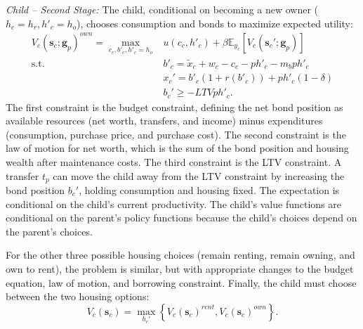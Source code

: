 \documentclass[12pt]{article}
\newcommand{\E}{\mathbb{E}}
\begin{document}
\textit{Child -- Second Stage:} The child, conditional on becoming a new owner ($h_c=h_r,h'_c=h_o$), chooses consumption and bonds to maximize expected utility:
\begin{equation}\label{eq:Vk}
\begin{split}
 V_c(\mathbf{s}_c;\mathbf{g}_p)^{own} = \max_{c_c,b'_c,h'_c=h_o} & u(c_c,h'_c) + \beta \E_{y_c}\left[V_{c}(\mathbf{s}_c';\mathbf{g}_p) \right] \\ 
 \text{s.t.}\quad & 	b'_c = \tilde x_c + w_c - c_c - p h'_c - m_b p h'_c \\
 & x_c' = b'_c(1+r(b'_c)) + p h'_c(1-\delta) \\
 & b_c' \ge - LTV p h'_c. 
\end{split}
\end{equation}
The first constraint is the budget constraint, defining the net bond position as available resources (net worth, transfers, and income) minus expenditures (consumption, purchase price, and purchase cost). The second constraint is the law of motion for net worth, which is the sum of the bond position and housing wealth after maintenance costs. The third constraint is the LTV constraint. A transfer $t_p$ can move the child away from the LTV constraint by increasing the bond position $b_c'$, holding consumption and housing fixed. The expectation is conditional on the child's current productivity. The child's value functions are conditional on the parent's policy functions because the child's choices depend on the parent's choices.

For the other three possible housing choices (remain renting, remain owning, and own to rent), the problem is similar, but with appropriate changes to the budget equation, law of motion, and borrowing constraint. Finally, the child must choose between the two housing options:
\begin{equation}
	V_c(\mathbf{s}_c) = \max_{h_c'} \left\{V_c(\mathbf{s}_c)^{rent},V_c(\mathbf{s}_c)^{own}\right\}.
\end{equation}
\end{document}
